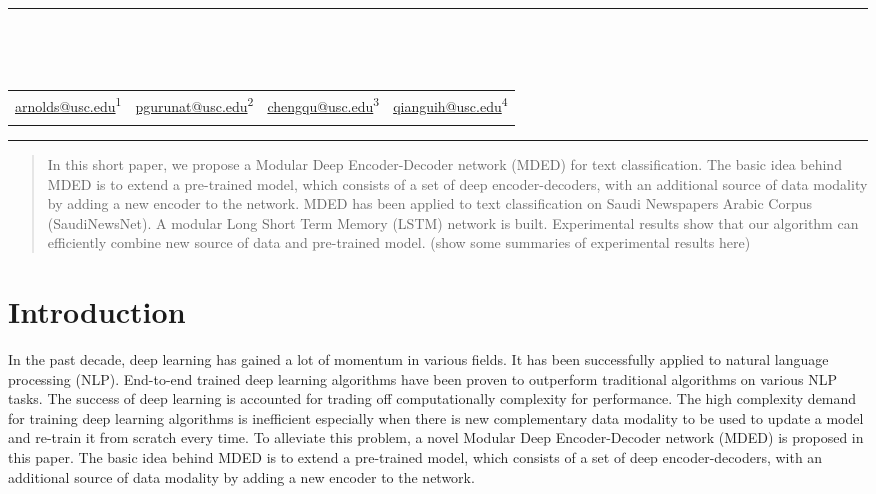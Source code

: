 \documentclass[12pt]{article}
\makeatletter
\newcommand\Mark[1]{\textsuperscript#1}
\def\maketitle{
	\par\rule{\textwidth}{2pt}
	\par\hfill
	\begin{centering}
	\begingroup
	\centering
	{\par\textbf{\LARGE\@title}\\[1.5em]
	\large\par{\textit{\@author}}}\\[1em]
	\begin{tabular}{*{4}{>{\centering}p{.23\textwidth}}}
	\url{arnolds@usc.edu}\Mark{1} & \url{pgurunat@usc.edu}\Mark{2} & \url{chengqu@usc.edu}\Mark{3} & \url{qianguih@usc.edu}\Mark{4} \tabularnewline
	9013085897 & 2251924199 & 9532576000 & 2385279985
	\end{tabular}\par
	\endgroup
	\par\rule{\textwidth}{2pt}
	\end{centering}
}
\makeatother
\begin{document}
\thispagestyle{empty}
\maketitle
\hfill
\begin{abstract}

In this short paper, we propose a Modular Deep Encoder-Decoder network (MDED) for text classification. The basic idea behind MDED is to extend a pre-trained model, which consists of a set of deep encoder-decoders, with an additional source of data modality by adding a new encoder to the network. MDED has been applied to text classification on Saudi Newspapers Arabic Corpus (SaudiNewsNet). A modular Long Short Term Memory (LSTM) network is built. Experimental results show that our algorithm can efficiently combine new source of data and pre-trained model. (show some summaries of experimental results here)

\end{abstract}

\section{Introduction}\label{introduction}


In the past decade, deep learning has gained a lot of momentum in various fields. It has been successfully applied to natural language processing (NLP). End-to-end trained deep learning algorithms have been proven to outperform traditional algorithms on various NLP tasks. The success of deep learning is accounted for trading off computationally complexity for performance. The high complexity demand for training deep learning algorithms is inefficient especially when there is new complementary data modality to be used to update a model and re-train it from scratch every time. To alleviate this problem, a novel Modular Deep Encoder-Decoder network (MDED) is proposed in this paper. The basic idea behind MDED is to extend a pre-trained model, which consists of a set of deep encoder-decoders, with an additional source of data modality by adding a new encoder to the network. 
\end{document}
